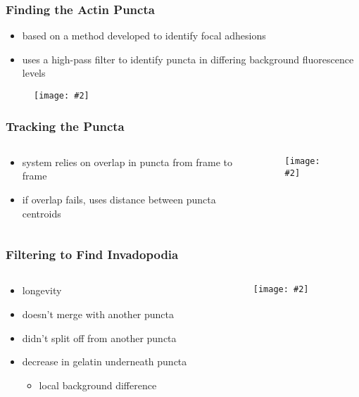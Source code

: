 \documentclass{beamer}
\newcommand{\centerfig}[3]{
	\begin{center}
	\begin{figure}[htbp]
	\texttt{[image: \#2]}
	\\{\tiny #3}
	\end{figure}
	\end{center}
}
\begin{document}
\begin{frame}
	\frametitle{Finding the Actin Puncta}
	\begin{itemize}
	\item based on a method developed to identify focal adhesions
	\item uses a high-pass filter to identify puncta in differing background fluorescence levels
	\end{itemize}
	\centerfig{width=\textwidth}{figures/invado_finding/finding_composite}{}
\end{frame}
		
\begin{frame}
	\frametitle{Tracking the Puncta}
	\begin{columns}
		\begin{column}{0.5\textwidth}
		\begin{itemize}
		\item system relies on overlap in puncta from frame to frame
		\item if overlap fails, uses distance between puncta centroids
		\end{itemize}
		\end{column}
		
		\begin{column}{0.5\textwidth}
		\centerfig{width=\textwidth}{figures/tracking_flowchart}{}
		\end{column}
	\end{columns}
\end{frame}

\begin{frame}
	\frametitle{Filtering to Find Invadopodia}
	\begin{columns}
		\begin{column}{0.5\textwidth}
		\begin{itemize}
		\item longevity
		\item doesn't merge with another puncta
		\item didn't split off from another puncta
		\item decrease in gelatin underneath puncta
			\begin{itemize}
			\item local background difference
			\end{itemize}
		\end{itemize}
		\end{column}
		
		\begin{column}{0.5\textwidth}
		\centerfig{width=0.9\textwidth}{figures/Local_background}{}
		\end{column}
	\end{columns}
\end{frame}
\end{document}
